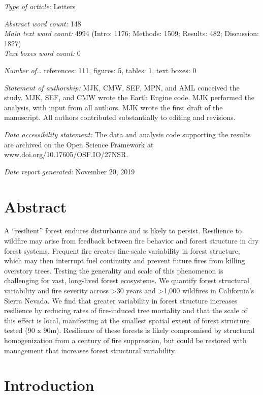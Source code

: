 \documentclass[]{article}
\begin{document}
\emph{Type of article:} Letters

\emph{Abstract word count:} 148\\
\emph{Main text word count:} 4994 (Intro: 1176; Methods: 1509; Results:
482; Discussion: 1827)\\
\emph{Text boxes word count:} 0

\emph{Number of\ldots{}} references: 111, figures: 5, tables: 1, text
boxes: 0

\emph{Statement of authorship:} MJK, CMW, SEF, MPN, and AML conceived
the study. MJK, SEF, and CMW wrote the Earth Engine code. MJK performed
the analysis, with input from all authors. MJK wrote the first draft of
the manuscript. All authors contributed substantially to editing and
revisions.

\emph{Data accessibility statement:} The data and analysis code
supporting the results are archived on the Open Science Framework at
www.doi.org/10.17605/OSF.IO/27NSR.

\emph{Date report generated:} November 20, 2019

\hypertarget{abstract}{%
\section{Abstract}\label{abstract}}

A ``resilient'' forest endures disturbance and is likely to persist.
Resilience to wildfire may arise from feedback between fire behavior and
forest structure in dry forest systems. Frequent fire creates fine-scale
variability in forest structure, which may then interrupt fuel
continuity and prevent future fires from killing overstory trees.
Testing the generality and scale of this phenomenon is challenging for
vast, long-lived forest ecosystems. We quantify forest structural
variability and fire severity across \textgreater{}30 years and
\textgreater{}1,000 wildfires in California's Sierra Nevada. We find
that greater variability in forest structure increases resilience by
reducing rates of fire-induced tree mortality and that the scale of this
effect is local, manifesting at the smallest spatial extent of forest
structure tested (90 x 90m). Resilience of these forests is likely
compromised by structural homogenization from a century of fire
suppression, but could be restored with management that increases forest
structural variability.

\hypertarget{introduction}{%
\section{Introduction}\label{introduction}}
\end{document}

